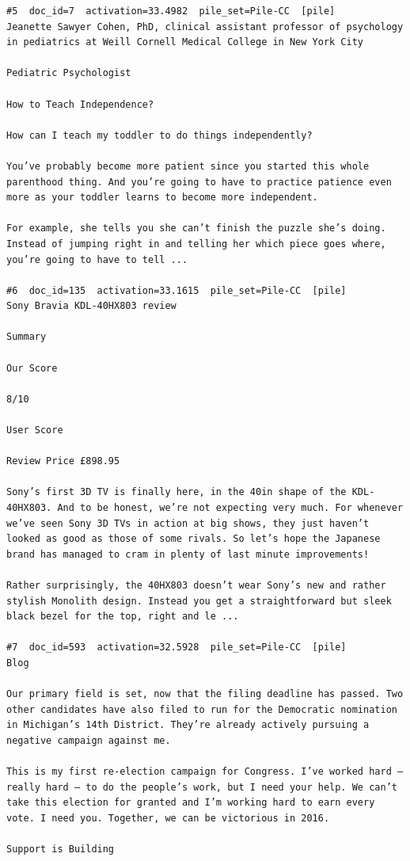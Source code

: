 \begin{verbatim}
#5  doc_id=7  activation=33.4982  pile_set=Pile-CC  [pile]
Jeanette Sawyer Cohen, PhD, clinical assistant professor of psychology in pediatrics at Weill Cornell Medical College in New York City

Pediatric Psychologist

How to Teach Independence?

How can I teach my toddler to do things independently?

You’ve probably become more patient since you started this whole parenthood thing. And you’re going to have to practice patience even more as your toddler learns to become more independent.

For example, she tells you she can’t finish the puzzle she’s doing. Instead of jumping right in and telling her which piece goes where, you’re going to have to tell ...

#6  doc_id=135  activation=33.1615  pile_set=Pile-CC  [pile]
Sony Bravia KDL-40HX803 review

Summary

Our Score

8/10

User Score

Review Price £898.95

Sony’s first 3D TV is finally here, in the 40in shape of the KDL-40HX803. And to be honest, we’re not expecting very much. For whenever we’ve seen Sony 3D TVs in action at big shows, they just haven’t looked as good as those of some rivals. So let’s hope the Japanese brand has managed to cram in plenty of last minute improvements!

Rather surprisingly, the 40HX803 doesn’t wear Sony’s new and rather stylish Monolith design. Instead you get a straightforward but sleek black bezel for the top, right and le ...

#7  doc_id=593  activation=32.5928  pile_set=Pile-CC  [pile]
Blog

Our primary field is set, now that the filing deadline has passed. Two other candidates have also filed to run for the Democratic nomination in Michigan’s 14th District. They’re already actively pursuing a negative campaign against me.

This is my first re-election campaign for Congress. I’ve worked hard — really hard — to do the people’s work, but I need your help. We can’t take this election for granted and I’m working hard to earn every vote. I need you. Together, we can be victorious in 2016.

Support is Building


\end{verbatim}

